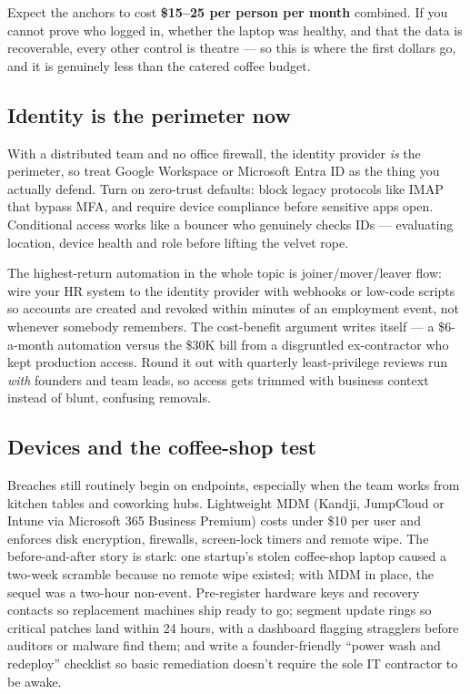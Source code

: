 Expect the anchors to cost \textbf{\$15–25 per person per month} combined. If you cannot prove who logged in, whether the laptop was healthy, and that the data is recoverable, every other control is theatre — so this is where the first dollars go, and it is genuinely less than the catered coffee budget.



\subsection{Identity is the perimeter now}


With a distributed team and no office firewall, the identity provider \emph{is} the perimeter, so treat Google Workspace or Microsoft Entra ID as the thing you actually defend. Turn on zero-trust defaults: block legacy protocols like IMAP that bypass MFA, and require device compliance before sensitive apps open. Conditional access works like a bouncer who genuinely checks IDs — evaluating location, device health and role before lifting the velvet rope.


The highest-return automation in the whole topic is joiner/mover/leaver flow: wire your HR system to the identity provider with webhooks or low-code scripts so accounts are created and revoked within minutes of an employment event, not whenever somebody remembers. The cost-benefit argument writes itself — a \$6-a-month automation versus the \$30K bill from a disgruntled ex-contractor who kept production access. Round it out with quarterly least-privilege reviews run \emph{with} founders and team leads, so access gets trimmed with business context instead of blunt, confusing removals.



\subsection{Devices and the coffee-shop test}


Breaches still routinely begin on endpoints, especially when the team works from kitchen tables and coworking hubs. Lightweight MDM (Kandji, JumpCloud or Intune via Microsoft 365 Business Premium) costs under \$10 per user and enforces disk encryption, firewalls, screen-lock timers and remote wipe. The before-and-after story is stark: one startup's stolen coffee-shop laptop caused a two-week scramble because no remote wipe existed; with MDM in place, the sequel was a two-hour non-event. Pre-register hardware keys and recovery contacts so replacement machines ship ready to go; segment update rings so critical patches land within 24 hours, with a dashboard flagging stragglers before auditors or malware find them; and write a founder-friendly ``power wash and redeploy'' checklist so basic remediation doesn't require the sole IT contractor to be awake.



